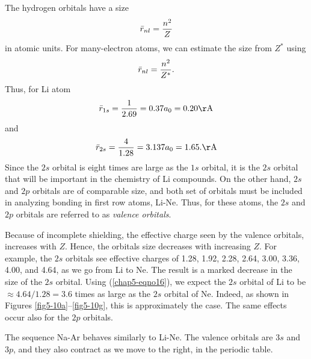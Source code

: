 The hydrogen orbitals have a size
\begin{equation}
{\bar r}_{nl} = {n^2 \over Z}
\end{equation}   
in atomic units.  For many-electron atoms, we can estimate the size 
from $Z^*$ using
\begin{equation}
{\bar r}_{nl} = {n^2 \over Z^*}.
\label{chap5-eqno16}
\end{equation}   
Thus, for Li atom
\begin{equation}
{\bar r}_{1s} = {1 \over 2.69} = 0.37 a_0 = 0.20 {\rm \AA}
\end{equation}
and
\begin{equation}
{\bar r}_{2s} = {4 \over 1.28} = 3.137 a_0 = 1.65. {\rm \AA}
\end{equation}
Since the $2s$ orbital is eight times are large as the $1s$ orbital, it 
is the $2s$ orbital that will be important in the chemistry of Li 
compounds. On the other hand, $2s$ and $2p$ orbitals are of comparable 
size, and both set of orbitals must be included in analyzing bonding in 
first row atoms, Li-Ne.  Thus, for these
atoms, the $2s$ and $2p$ orbitals are referred to as 
\emph{valence orbitals}.

Because of incomplete shielding, the effective charge seen by the
valence orbitals, increases with $Z$.  Hence, the orbitals size
decreases with increasing $Z$.  For example, the $2s$ orbitals see
effective charges of 1.28, 1.92, 2.28, 2.64, 3.00, 3.36, 4.00, and
4.64, as we go from Li to Ne.  The result is a marked decrease in the
size of the $2s$ orbital.  Using (\ref{chap5-eqno16}), we expect the
$2s$ orbital of Li to be $\approx 4.64/1.28 = 3.6$ times as large as
the $2s$ orbital of Ne.  Indeed, as shown in Figures
\ref{fig5-10a}--\ref{fig5-10g}, this is approximately the case. The
same effects occur also for the $2p$ orbitals.

The sequence Na-Ar behaves similarly to Li-Ne. The valence orbitals 
are $3s$ and $3p$, and they also contract as we move to the right, in the 
periodic table.


